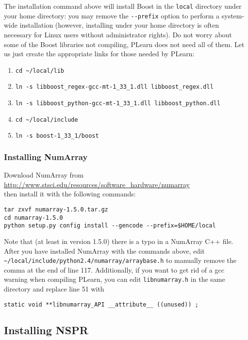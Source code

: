 \documentclass[11pt]{book}
\begin{document}
The installation command above will install Boost in the \verb!local! directory
under your home directory: you may remove the \verb!--prefix! option to perform
a system-wide installation (however, installing under your home directory is often
necessary for Linux users without administrator rights).
Do not worry about some of the Boost libraries not compiling, PLearn does not
need all of them.
Let us just create the appropriate links for those needed by PLearn:
\begin{enumerate}
\item \verb!cd ~/local/lib!
\item \verb!ln -s libboost_regex-gcc-mt-1_33_1.dll libboost_regex.dll!
\item \verb!ln -s libboost_python-gcc-mt-1_33_1.dll libboost_python.dll!
\item \verb!cd ~/local/include!
\item \verb!ln -s boost-1_33_1/boost!
\end{enumerate}

\subsubsection{Installing NumArray}

Download NumArray from \\
\url{http://www.stsci.edu/resources/software\_hardware/numarray} \\
then install it with the following commands:
\begin{verbatim}
tar zxvf numarray-1.5.0.tar.gz
cd numarray-1.5.0
python setup.py config install --gencode --prefix=$HOME/local
\end{verbatim}

Note that (at least in version 1.5.0) there is a typo in a NumArray C++ file.
After you have installed NumArray with the commands above, edit
\verb!~/local/include/python2.4/numarray/arraybase.h! to manually remove the comma
at the end of line 117. Additionally, if you want to get rid of a gcc warning
when compiling PLearn, you can edit \verb!libnumarray.h!
in the same directory and replace line 51 with
\begin{verbatim}
static void **libnumarray_API __attribute__ ((unused)) ;
\end{verbatim}

\subsection{Installing NSPR}
\end{document}
